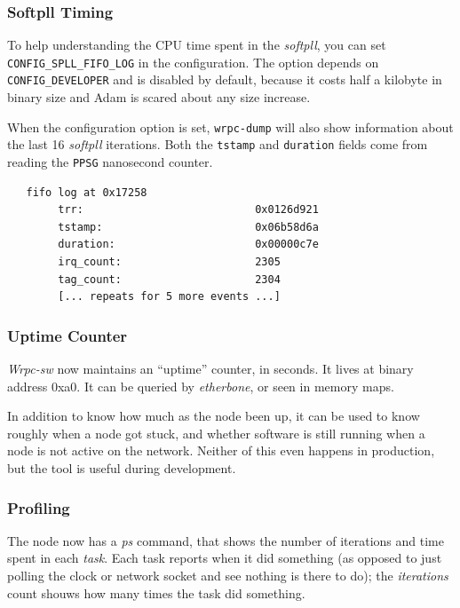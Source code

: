\documentclass[a4paper, 12pt]{article}
\begin{document}
\subsubsection{Softpll Timing}
\label{spll Softpll Timing}

To help understanding the CPU time spent in the \textit{softpll}, you can
set \texttt{CONFIG\_SPLL\_FIFO\_LOG} in the configuration. The option
depends on \texttt{CONFIG\_DEVELOPER} and is disabled by default, because
it costs half a kilobyte in binary size and Adam is scared about any size
increase.

When the configuration option is set, \texttt{wrpc-dump} will also show
information about the last 16 \textit{softpll} iterations. Both the \texttt{tstamp}
and \texttt{duration} fields come from reading the \texttt{PPSG} nanosecond counter.

\begin{lstlisting}
   fifo log at 0x17258
        trr:                           0x0126d921
        tstamp:                        0x06b58d6a
        duration:                      0x00000c7e
        irq_count:                     2305
        tag_count:                     2304
        [... repeats for 5 more events ...]
\end{lstlisting}

\subsubsection{Uptime Counter}
\label{Uptime Counter}

\textit{Wrpc-sw} now maintains an ``uptime'' counter, in seconds. It lives
at binary address 0xa0. It can be queried by \textit{etherbone}, or
seen in memory maps.

In addition to know how much as the node been up, it can be used to
know roughly when a node got stuck, and whether software is still
running when a node is not active on the network. Neither of this even
happens in production, but the tool is useful during development.

\subsubsection{Profiling}
\label{Profiling}

The node now has a \textit{ps} command, that shows the number of iterations
and time spent in each \textit{task}. Each task reports when it did
something (as opposed to just polling the clock or network socket and
see nothing is there to do); the \textit{iterations} count shouws how many
times the task did something.
\end{document}
